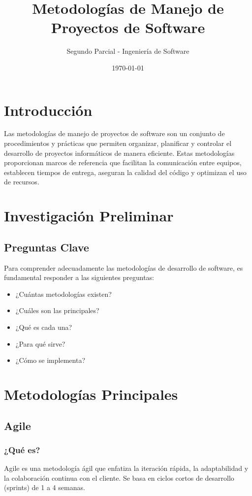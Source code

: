 \documentclass[12pt, a4paper]{article}
\title{\textbf{Metodologías de Manejo de Proyectos de Software}}
\author{Segundo Parcial - Ingeniería de Software}
\date{\today}
\begin{document}
\maketitle

\tableofcontents
\newpage

\section{Introducción}

Las metodologías de manejo de proyectos de software son un conjunto de procedimientos y prácticas que permiten organizar, planificar y controlar el desarrollo de proyectos informáticos de manera eficiente. Estas metodologías proporcionan marcos de referencia que facilitan la comunicación entre equipos, establecen tiempos de entrega, aseguran la calidad del código y optimizan el uso de recursos.

\section{Investigación Preliminar}

\subsection{Preguntas Clave}

Para comprender adecuadamente las metodologías de desarrollo de software, es fundamental responder a las siguientes preguntas:

\begin{itemize}
    \item ¿Cuántas metodologías existen?
    \item ¿Cuáles son las principales?
    \item ¿Qué es cada una?
    \item ¿Para qué sirve?
    \item ¿Cómo se implementa?
\end{itemize}

\section{Metodologías Principales}

\subsection{Agile}

\subsubsection{¿Qué es?}
Agile es una metodología ágil que enfatiza la iteración rápida, la adaptabilidad y la colaboración continua con el cliente. Se basa en ciclos cortos de desarrollo (sprints) de 1 a 4 semanas.
\end{document}
